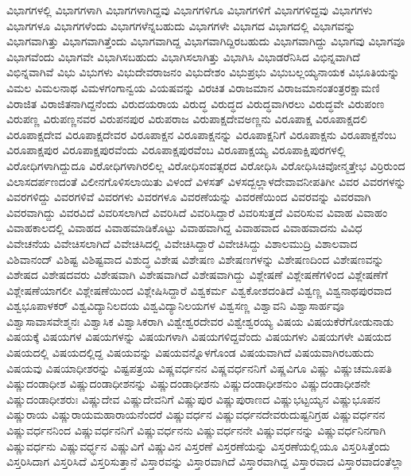 {ವಿಭಾಗಗಳಲ್ಲಿ
ವಿಭಾಗಗಳಾಗಿ
ವಿಭಾಗಗಳಾಗಿದ್ದವು
ವಿಭಾಗಗಳಿಗೂ
ವಿಭಾಗಗಳಿಗೆ
ವಿಭಾಗಗಳಿದ್ದವು
ವಿಭಾಗಗಳು
ವಿಭಾಗಗಳೂ
ವಿಭಾಗಗಳೆಂದು
ವಿಭಾಗಗಳೆನ್ನಬಹುದು
ವಿಭಾಗಗಳೇ
ವಿಭಾಗದ
ವಿಭಾಗದಲ್ಲಿ
ವಿಭಾಗವನ್ನು
ವಿಭಾಗವಾಗಿತ್ತು
ವಿಭಾಗವಾಗಿತ್ತೆಂದು
ವಿಭಾಗವಾಗಿದ್ದ
ವಿಭಾಗವಾಗಿದ್ದಿರಬಹುದು
ವಿಭಾಗವಾಗಿದ್ದು
ವಿಭಾಗವು
ವಿಭಾಗವೂ
ವಿಭಾಗವೆಂದು
ವಿಭಾಗವೇ
ವಿಭಾಗಿಸಬಹುದು
ವಿಭಾಗಿಸಲಾಗಿತ್ತು
ವಿಭಾಗಿಸಿ
ವಿಭಾಡರೆನಿಸಿದ
ವಿಭಿನ್ನವಾಗಿದೆ
ವಿಭಿನ್ನವಾಗಿವೆ
ವಿಭು
ವಿಭುಗಳು
ವಿಭುದೇವರಾಜನಂ
ವಿಭುದೇಶಂ
ವಿಭುಪ್ರಭು
ವಿಭುಬಲ್ಲಯ್ಯನಾಯಕ
ವಿಭೂತಿಯನ್ನು
ವಿಮಲ
ವಿಮಲನಾಥ
ವಿಮಳಗಂಗಾನ್ವಯ
ವಿಯಷವನ್ನು
ವಿರಚಿತ
ವಿರಾಜಮಾನ
ವಿರಾಜಮಾನಂತಂತ್ರರಕ್ಷಾಮಣಿ
ವಿರಾಜಿತ
ವಿರಾಜಿತನಾಗಿದ್ದನೆಂದು
ವಿರುದಯರಾಯ
ವಿರುದ್ಧ
ವಿರುದ್ಧದ
ವಿರುದ್ಧವಾಗಿರಲು
ವಿರುದ್ಧವೇ
ವಿರುಪಂಣ
ವಿರುಪಣ್ಣ
ವಿರುಪಣ್ಣನವರ
ವಿರುಪನಪುರ
ವಿರುಪರಾಜ
ವಿರುಪಾಕ್ಷದೇವಅಣ್ಣನು
ವಿರೂಪಾಕ್ಷ
ವಿರೂಪಾಕ್ಷದಲಿ
ವಿರೂಪಾಕ್ಷದೇವ
ವಿರೂಪಾಕ್ಷದೇವರ
ವಿರೂಪಾಕ್ಷನ
ವಿರೂಪಾಕ್ಷನನ್ನು
ವಿರೂಪಾಕ್ಷನಿಗೆ
ವಿರೂಪಾಕ್ಷನು
ವಿರೂಪಾಕ್ಷನೆಂಬ
ವಿರೂಪಾಕ್ಷಪುರ
ವಿರೂಪಾಕ್ಷಪುರವೆಂದು
ವಿರೂಪಾಕ್ಷಪುರವೆಂಬ
ವಿರೂಪಾಕ್ಷಯ್ಯ
ವಿರೂಪಾಕ್ಷಿಪುರಗಳಲ್ಲಿ
ವಿರೋಧಿಗಳಾಗಿದ್ದುದೂ
ವಿರೋಧಿಗಳಾಗಿರಲಿಲ್ಲ
ವಿರೋಧಿಸಂವತ್ಸರದ
ವಿರೋಧಿಸಿ
ವಿರೋಧಿಸಿಚಿವೋನ್ಮತ್ತೇಭ
ವಿರ್ರಿರುಂದ
ವಿಲಾಸದರ್ಪಣದಂತೆ
ವಿಲೀನಗೊಳಿಸಲಾಯಿತು
ವಿಳಂದೆ
ವಿಳಸತ್
ವಿಳಸದ್ಬಲ್ಲಾಳದೇವಾವನೀಪತಿಗೀ
ವಿವರ
ವಿವರಗಳನ್ನು
ವಿವರಗಳಿದ್ದು
ವಿವರಗಳಿವೆ
ವಿವರಗಳು
ವಿವರಗಳೂ
ವಿವರಣೆಯನ್ನು
ವಿವರಣೆಯಿಂದ
ವಿವರವನ್ನು
ವಿವರವಾಗಿ
ವಿವರವಾಗಿದ್ದು
ವಿವರವಿದೆ
ವಿವರಿಸಲಾಗಿದೆ
ವಿವರಿಸಿದೆ
ವಿವರಿಸಿದ್ದಾರೆ
ವಿವರಿಸುತ್ತದೆ
ವಿವರಿಸುವ
ವಿವಾಹ
ವಿವಾಹಂ
ವಿವಾಹಕಾಲದಲ್ಲಿ
ವಿವಾಹದ
ವಿವಾಹಮಾಡಿಕೊಟ್ಟು
ವಿವಾಹವಾಗಿದ್ದ
ವಿವಾಹವಾದ
ವಿವಾಹವಾದನು
ವಿವಿಧ
ವಿವೇಚನೆಯ
ವಿವೇಚಿಸಲಾಗಿದೆ
ವಿವೇಚಿಸಿದಲ್ಲಿ
ವಿವೇಚಿಸಿದ್ದಾರೆ
ವಿವೇಚಿಸಿದ್ದು
ವಿಶಾಲಮುದ್ರಿ
ವಿಶಾಲವಾದ
ವಿಶಿವಾನಂದ್
ವಿಶಿಷ್ಟ
ವಿಶಿಷ್ಟವಾದ
ವಿಶುದ್ಧ
ವಿಶೇಷ
ವಿಶೇಷಣ
ವಿಶೇಷಣಗಳನ್ನು
ವಿಶೇಷಣದಿಂದ
ವಿಶೇಷಣವನ್ನು
ವಿಶೇಷದ
ವಿಶೇಷದವರು
ವಿಶೇಷವಾಗಿ
ವಿಶೇಷವಾಗಿದೆ
ವಿಶೇಷವಾಗಿದ್ದು
ವಿಶ್ಲೇಷಣೆ
ವಿಶ್ಲೇಷಣೆಗಳಿಂದ
ವಿಶ್ಲೇಷಣೆಗೆ
ವಿಶ್ಲೇಷಣೆಯಾಗಲೀ
ವಿಶ್ಲೇಷಣೆಯಿಂದ
ವಿಶ್ಲೇಷಿಸಿದ್ದಾರೆ
ವಿಶ್ವಕರ್ಮ
ವಿಶ್ವಕೋಶದಂತಿದೆ
ವಿಶ್ವಣ್ಣ
ವಿಶ್ವನಾಥಪುರವಾದ
ವಿಶ್ವಭೂಪಾಳಕರ್
ವಿಶ್ವವಿದ್ಯಾನಿಲದಯ
ವಿಶ್ವವಿದ್ಯಾನಿಲಯಗಳ
ವಿಶ್ವಸಣ್ಣ
ವಿಶ್ವಾವನಿ
ವಿಶ್ವಾಸಾರ್ಹವೂ
ವಿಶ್ವಾಸಾವಾಸವೇಶ್ಮನಃ
ವಿಶ್ವಾಸಿಕ
ವಿಶ್ವಾಸಿಕರಾಗಿ
ವಿಶ್ವೇಶ್ವರದೇವರ
ವಿಶ್ವೇಶ್ವರಯ್ಯ
ವಿಷಯ
ವಿಷಯಕೆರೆಗೋಡುನಾಡು
ವಿಷಯಕ್ಕೆ
ವಿಷಯಗಳ
ವಿಷಯಗಳನ್ನು
ವಿಷಯಗಳಾಗಿ
ವಿಷಯಗಳಿದ್ದವೆಂದು
ವಿಷಯಗಳು
ವಿಷಯಗಳೇ
ವಿಷಯದ
ವಿಷಯದಲ್ಲಿ
ವಿಷಯದಲ್ಲಿದ್ದ
ವಿಷಯವನ್ನು
ವಿಷಯವನ್ನೊಳಗೊಂಡ
ವಿಷಯವಾಗಿದೆ
ವಿಷಯವಾಗಿರಬಹುದು
ವಿಷಯವು
ವಿಷಯಾಧೀಶರನ್ನು
ವಿಷ್ಟಪತ್ರಯ
ವಿಷ್ಣವರ್ಧನನ
ವಿಷ್ಣವರ್ಧನನಿಗೆ
ವಿಷ್ಣವಿಗೂ
ವಿಷ್ಣು
ವಿಷ್ಣುಚಮೂಪತಿ
ವಿಷ್ಣುದಂಡಾಧೀಶ
ವಿಷ್ಣುದಂಡಾಧೀಶನನ್ನು
ವಿಷ್ಣುದಂಡಾಧೀಶನು
ವಿಷ್ಣುದಂಡಾಧೀಶನುಂ
ವಿಷ್ಣುದಂಡಾಧೀಶನೇ
ವಿಷ್ಣುದಂಡಾಧೀಶರುಃ
ವಿಷ್ಣುದೇವ
ವಿಷ್ಣುದೇವನಿಗೆ
ವಿಷ್ಣುಪುರ
ವಿಷ್ಣುಪುರಾಣದ
ವಿಷ್ಣುಭಟ್ಟಯ್ಯನ
ವಿಷ್ಣುಭೂಪನ
ವಿಷ್ಣುರಾಯ
ವಿಷ್ಣುರಾಯಮಹಾರಾಯನೆಂದರೆ
ವಿಷ್ಣುವರ್ಧನ
ವಿಷ್ಣುವರ್ಧನದೇವರುದುಷ್ಟನಿಗ್ರಹ
ವಿಷ್ಣುವರ್ಧನನ
ವಿಷ್ಣುವರ್ಧನನಿಂದ
ವಿಷ್ಣುವರ್ಧನನಿಗೆ
ವಿಷ್ಣುವರ್ಧನನು
ವಿಷ್ಣುವರ್ಧನನೇ
ವಿಷ್ಣುವರ್ಧನನ್ನು
ವಿಷ್ಣುವರ್ಧನಿನಗಾಗಿ
ವಿಷ್ಣುವರ್ಧನು
ವಿಷ್ಣುವರ್ಧ್ಧನ
ವಿಷ್ಣುವಿಗೆ
ವಿಷ್ಣುವಿನ
ವಿಸ್ತರಣೆ
ವಿಸ್ತರಣೆಯನ್ನು
ವಿಸ್ತರಣೆಯಲ್ಲಿಯೂ
ವಿಸ್ತರಿಸಿತ್ತೆಂದು
ವಿಸ್ತರಿಸಿದಾಗ
ವಿಸ್ತರಿಸಿದೆ
ವಿಸ್ತರಿಸುತ್ತಾನೆ
ವಿಸ್ತಾರವನ್ನು
ವಿಸ್ತಾರವಾಗಿದೆ
ವಿಸ್ತಾರವಾಗಿದ್ದ
ವಿಸ್ತಾರವಾದ
ವಿಸ್ತಾರವಾದಂತೆಲ್ಲಾ
}
